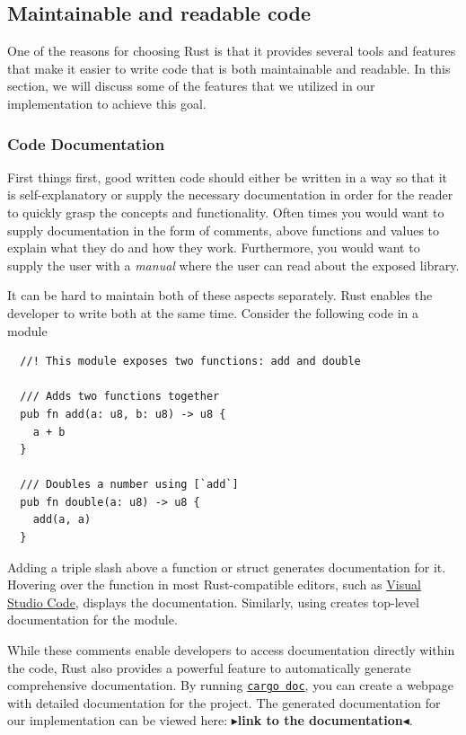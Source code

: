 \documentclass[11pt]{report}
\theoremstyle{definition}
\theoremstyle{plain}
\newcommand{\todo}[1]{{\color[rgb]{.5,0,0}\textbf{$\blacktriangleright$#1$\blacktriangleleft$}}}
\begin{document}
\subsection{Maintainable and readable code}
One of the reasons for choosing Rust is that it provides several tools and features that make it easier to write code that is both maintainable and readable. In this section, we will discuss some of the features that we utilized in our implementation to achieve this goal.

\subsubsection{Code Documentation}\label{sub:code-documentation}
First things first, good written code should either be written in a way so that it is self-explanatory or supply the necessary documentation in order for the reader to quickly grasp the concepts and functionality. Often times you would want to supply documentation in the form of comments, above functions and values to explain what they do and how they work. Furthermore, you would want to supply the user with a \textit{manual} where the user can read about the exposed library.

It can be hard to maintain both of these aspects separately. Rust enables the developer to write both at the same time. Consider the following code in a module

\begin{verbatim}
  //! This module exposes two functions: add and double

  /// Adds two functions together
  pub fn add(a: u8, b: u8) -> u8 { 
    a + b
  }

  /// Doubles a number using [`add`]
  pub fn double(a: u8) -> u8 {
    add(a, a)
  }
\end{verbatim}

Adding a triple slash \rust{///} above a function or struct generates documentation for it. Hovering over the function in most Rust-compatible editors, such as \href{https://code.visualstudio.com/docs/languages/rust}{Visual Studio Code}, displays the documentation. Similarly, using \rust{//!} creates top-level documentation for the module.

While these comments enable developers to access documentation directly within the code, Rust also provides a powerful feature to automatically generate comprehensive documentation. By running \href{https://doc.rust-lang.org/cargo/commands/cargo-doc.html}{\texttt{cargo doc}}, you can create a webpage with detailed documentation for the project. The generated documentation for our implementation can be viewed here: \todo{link to the documentation}.
\end{document}
